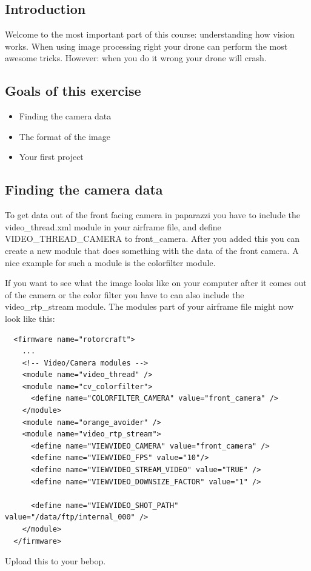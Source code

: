 \documentclass{article}
\begin{document}

\subsection*{Introduction}
Welcome to the most important part of this course: understanding how vision works. When using image processing right your drone can perform the most awesome tricks. However: when you do it wrong your drone will crash. 

\subsection*{Goals of this exercise}
\begin{itemize}
\item Finding the camera data
\item The format of the image
\item Your first project
\end{itemize}

\subsection*{Finding the camera data}
To get data out of the front facing camera in paparazzi you have to include the video\_thread.xml module in your airframe file, and define VIDEO\_THREAD\_CAMERA to front\_camera. After you added this you can create a new module that does something with the data of the front camera. A nice example for such a module is the colorfilter module.

If you want to see what the image looks like on your computer after it comes out of the camera or the color filter you have to can also include the video\_rtp\_stream  module. 
The modules part of your airframe file might now look like this:
\begin{verbatim}
  <firmware name="rotorcraft">
    ...
    <!-- Video/Camera modules -->
    <module name="video_thread" />
    <module name="cv_colorfilter">
      <define name="COLORFILTER_CAMERA" value="front_camera" />
    </module>
    <module name="orange_avoider" />
    <module name="video_rtp_stream">
      <define name="VIEWVIDEO_CAMERA" value="front_camera" />
      <define name="VIEWVIDEO_FPS" value="10"/>
      <define name="VIEWVIDEO_STREAM_VIDEO" value="TRUE" />
      <define name="VIEWVIDEO_DOWNSIZE_FACTOR" value="1" />
      
      <define name="VIEWVIDEO_SHOT_PATH" value="/data/ftp/internal_000" />
    </module>
  </firmware>
\end{verbatim}
Upload this to your bebop.
\end{document}
